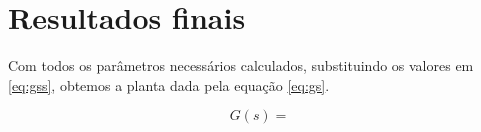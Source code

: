 \documentclass{article}
\begin{document}
\section{Resultados finais}
Com todos os parâmetros necessários calculados, substituindo os valores em \ref{eq:gss}, obtemos a planta dada pela equação \ref{eq:gs}.

\begin{equation}
\label{eq:gs}
G(s)=%
\end{equation}


\begin{thebibliography}{widestlabel}
\end{thebibliography}
\end{document}
